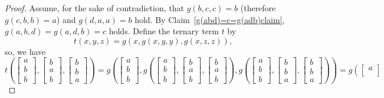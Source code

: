 \documentclass[11pt]{amsart}
\theoremstyle{definition}
\theoremstyle{remark}
\theoremstyle{plain}
\begin{document}
\begin{enumerate}[wide, labelindent=0pt]
\begin{enumerate}[wide, labelindent=0pt]
\begin{proof}
Assume, for the sake of contradiction, that $g(b,c,c)=b$ (therefore $g(c,b,b)=a$) and $g(d,a,a)=b$ hold. By Claim~\ref{g(abd)=c=g(adb)claim}, $g(a,b,d)=g(a,d,b)=c$ holds. Define the ternary term $t$ by $$t(x,y,z)=g(x,g(x,y,y),g(x,z,z)),$$ so, we have 
 \begin{equation*}
t\left(
\begin{bmatrix}
a \\
b \\
b
\end{bmatrix}\!,\!
\begin{bmatrix}
b \\
a \\
b
\end{bmatrix}\!,\!
\begin{bmatrix}
b \\
b \\
a
\end{bmatrix}
\right)=
g\left(
\begin{bmatrix}
a \\
b \\
b
\end{bmatrix}\!,\!
g\left(
\begin{bmatrix}
a \\
b \\
b
\end{bmatrix}\!,\!
\begin{bmatrix}
b \\
a \\
b
\end{bmatrix}\!,\!
\begin{bmatrix}
b \\
a \\
b
\end{bmatrix}
\right)\!,\!
g\left(
\begin{bmatrix}
a \\
b \\
b
\end{bmatrix}\!,\!
\begin{bmatrix}
b \\
b \\
a
\end{bmatrix}\!,\!
\begin{bmatrix}
b \\
b \\
a
\end{bmatrix}
\right)
\right)=
g\left(
\begin{bmatrix}
a \\

\end{bmatrix}
\end{equation*}
\end{proof}
\end{enumerate}
\end{enumerate}
\end{document}
